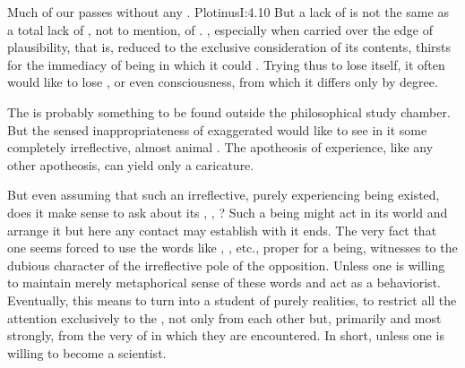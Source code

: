 
\pa Much of our  passes without any .  \citet{And even in our conscious life we can point to many noble
activities, of mind and of hand alike, which at the time in no way
compel our consciousness. A reader will often be quite unconscious
when he is most intent: in a feat of courage there can be no sense
either of the brave action or of the fact that all that is done
conforms to the rules of courage. And so in cases beyond number.}
{Plotinus}{I:4.10}  
%
But a lack of  is not the same as a total lack of
, not to mention, of . 
, especially when carried over the edge of
plausibility, that is, reduced to the exclusive consideration of its
 contents, thirsts for the immediacy of being in which it
could . Trying thus to lose itself, it often would like to
lose , or even consciousness, from which it differs only by degree.


 The  is probably something to be  found outside the philosophical study
chamber. But the sensed inappropriateness of exaggerated  would
like to see in it some completely irreflective, almost animal 
. The apotheosis of experience, like any other apotheosis,
can yield only a caricature.

But even assuming that such an irreflective, purely experiencing being existed,
does it make sense to ask about its , ,
? Such a being might act in its world and arrange it but here any
contact  may establish with it ends. The very fact that one seems
forced to use the words like , , etc., proper for a
 being, witnesses to the dubious character of the irreflective
pole of the opposition. Unless one is willing to maintain merely metaphorical sense of
these words and act as a behaviorist. Eventually, this means to turn into a
student of purely  realities, to restrict all the attention
exclusively to the ,  not only from each other but,
primarily and most strongly, from the very  of  in which
they are encountered. In short, unless one is willing to become a scientist.

